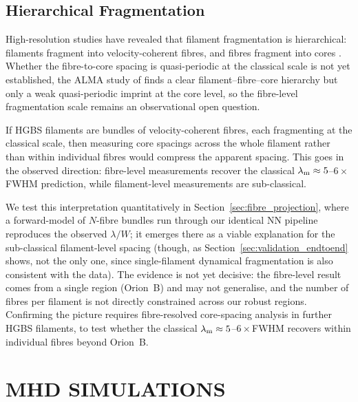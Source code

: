 \documentclass[usenatbib,twoside,twocolumn]{mnras}
\begin{document}
\subsection{Hierarchical Fragmentation}

High-resolution studies have revealed that filament fragmentation is hierarchical: filaments fragment into velocity-coherent fibres, and fibres fragment into cores \citep{Hacar2013,Hacar2018,Yang2024}. Whether the fibre-to-core spacing is quasi-periodic at the classical scale is not yet established, the ALMA study of \citet{Yang2024} finds a clear filament--fibre--core hierarchy but only a weak quasi-periodic imprint at the core level, so the fibre-level fragmentation scale remains an observational open question.

If HGBS filaments are bundles of velocity-coherent fibres, each fragmenting at the classical scale, then measuring core spacings across the whole filament rather than within individual fibres would compress the apparent spacing. This goes in the observed direction: fibre-level measurements recover the classical $\lambda_{\rm m}\approx5$--$6\times$FWHM prediction, while filament-level measurements are sub-classical.

We test this interpretation quantitatively in Section~\ref{sec:fibre_projection}, where a forward-model of $N$-fibre bundles run through our identical NN pipeline reproduces the observed $\lambda/W$; it emerges there as a viable explanation for the sub-classical filament-level spacing (though, as Section~\ref{sec:validation_endtoend} shows, not the only one, since single-filament dynamical fragmentation is also consistent with the data). The evidence is not yet decisive: the \citet{Yang2024} fibre-level result comes from a single region (Orion~B) and may not generalise, and the number of fibres per filament is not directly constrained across our robust regions. Confirming the picture requires fibre-resolved core-spacing analysis in further HGBS filaments, to test whether the classical $\lambda_{\rm m}\approx5$--$6\times$FWHM recovers within individual fibres beyond Orion~B.

\section{MHD SIMULATIONS}
\end{document}
